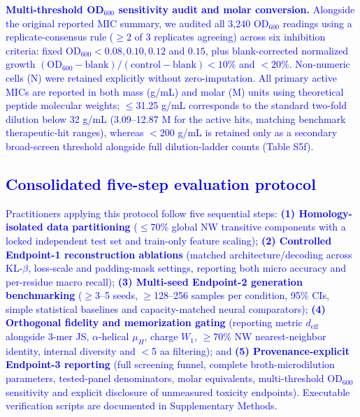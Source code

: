 \documentclass[unnumsec,webpdf,contemporary,large]{oup-authoring-template}
\newcommand{\rev}[1]{\textcolor{blue}{#1}}
\begin{document}
\rev{\textbf{Multi-threshold OD$_{600}$ sensitivity audit and molar conversion.} Alongside the original reported MIC summary, we audited all 3,240 OD$_{600}$ readings using a replicate-consensus rule ($\geq$2 of 3 replicates agreeing) across six inhibition criteria: fixed OD$_{600} < 0.08, 0.10, 0.12$ and $0.15$, plus blank-corrected normalized growth $(\mathrm{OD}_{600}-\mathrm{blank})/(\mathrm{control}-\mathrm{blank}) < 10\%$ and $<20\%$. Non-numeric cells (N) were retained explicitly without zero-imputation. All primary active MICs are reported in both mass (\textmu{}g/mL) and molar (\textmu{}M) units using theoretical peptide molecular weights; $\leq$31.25 \textmu{}g/mL corresponds to the standard two-fold dilution below 32 \textmu{}g/mL (3.09--12.87 \textmu{}M for the active hits, matching benchmark therapeutic-hit ranges), whereas $<$200 \textmu{}g/mL is retained only as a secondary broad-screen threshold alongside full dilution-ladder counts (Table S5f).}

\rev{\subsection{Consolidated five-step evaluation protocol}}
\rev{Practitioners applying this protocol follow five sequential steps: \textbf{(1) Homology-isolated data partitioning} ($\leq$70\% global NW transitive components with a locked independent test set and train-only feature scaling); \textbf{(2) Controlled Endpoint-1 reconstruction ablations} (matched architecture/decoding across KL-$\beta$, loss-scale and padding-mask settings, reporting both micro accuracy and per-residue macro recall); \textbf{(3) Multi-seed Endpoint-2 generation benchmarking} ($\geq$3--5 seeds, $\geq$128--256 samples per condition, 95\% CIs, simple statistical baselines and capacity-matched neural comparators); \textbf{(4) Orthogonal fidelity and memorization gating} (reporting metric $d_{\mathrm{eff}}$ alongside 3-mer JS, $\alpha$-helical $\mu_H$, charge $W_1$, $\geq$70\% NW nearest-neighbor identity, internal diversity and $<$5 aa filtering); and \textbf{(5) Provenance-explicit Endpoint-3 reporting} (full screening funnel, complete broth-microdilution parameters, tested-panel denominators, molar equivalents, multi-threshold OD$_{600}$ sensitivity and explicit disclosure of unmeasured toxicity endpoints). Executable verification scripts are documented in Supplementary Methods.}
\end{document}
